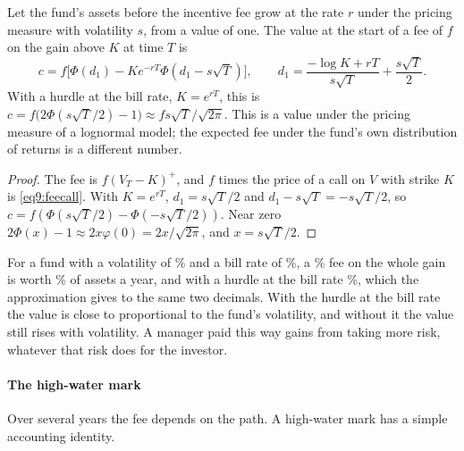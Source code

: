 \begin{chapterrefs}
\begin{proposition}\label{prop9:feecall}
Let the fund's assets before the incentive fee grow at the rate $r$ under the pricing measure with
volatility $s$, from a value of one. The value at the start of a fee of $f$ on the gain above $K$ at time
$T$ is
\begin{equation}\label{eq9:feecall}
  c=f\bigl[\Phi(d_1)-Ke^{-rT}\Phi(d_1-s\sqrt T)\bigr],\qquad d_1=\frac{-\log K+rT}{s\sqrt T}+\frac{s\sqrt T}2 .
\end{equation}
With a hurdle at the bill rate, $K=e^{rT}$, this is $c=f\bigl(2\Phi(s\sqrt T/2)-1\bigr)\approx fs\sqrt{T}/\sqrt{2\pi}$.
This is a value under the pricing measure of a lognormal model; the expected fee under the fund's own
distribution of returns is a different number.
\end{proposition}

\begin{proof}
The fee is $f(V_T-K)^+$, and $f$ times the price of a call on $V$ with strike $K$ is \cref{eq9:feecall}. With
$K=e^{rT}$, $d_1=s\sqrt T/2$ and $d_1-s\sqrt T=-s\sqrt T/2$, so $c=f(\Phi(s\sqrt T/2)-\Phi(-s\sqrt T/2))$. Near zero
$2\Phi(x)-1\approx2x\varphi(0)=2x/\sqrt{2\pi}$, and $x=s\sqrt T/2$.
\end{proof}

For a fund with a volatility of \feOptVol\% and a bill rate of \feRf\%, a \feF\% fee on the whole gain is worth
\feOptAtm\% of assets a year, and with a hurdle at the bill rate \feOptFwd\%, which the approximation gives to the
same two decimals. With the hurdle at the bill rate the value is close to proportional to the fund's
volatility, and without it the value still rises with volatility. A manager paid this way gains
from taking more risk, whatever that risk does for the investor.

\paragraph{The high-water mark}
Over several years the fee depends on the path. A high-water mark has a simple accounting identity.


\end{chapterrefs}
